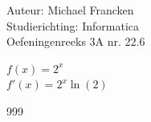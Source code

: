 \documentclass[a4paper]{article}
\begin{document}
\noindent \large Auteur: Michael Francken \\
\noindent \large Studierichting: Informatica\\
\noindent \large Oefeningenreeks 3A nr. 22.6\\

\medskip

\normalsize
$f(x)=2^x$\\

$f'(x)=2^x\ln(2)$\\




\begin{thebibliography}{999}
\end{thebibliography}
\end{document}
